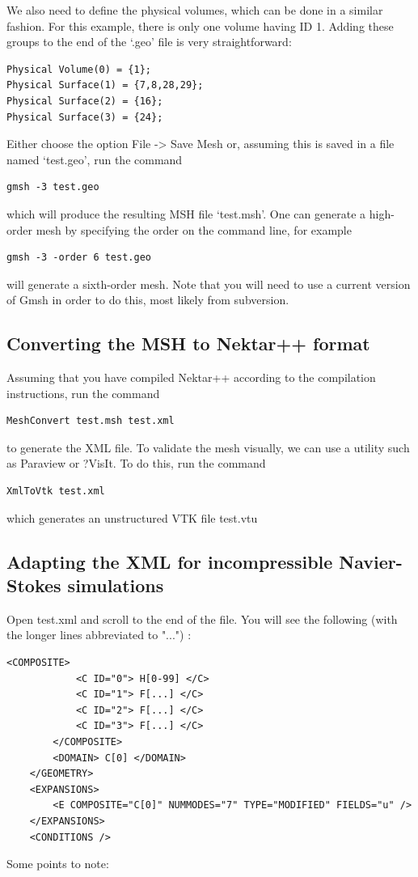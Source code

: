 We also need to define the physical volumes, which can be done in a similar fashion. For this example, there is only one volume having ID 1. Adding these groups to the end of the `.geo' file is very straightforward:

\begin{lstlisting}[style=XmlStyle]
Physical Volume(0) = {1};
Physical Surface(1) = {7,8,28,29};
Physical Surface(2) = {16};
Physical Surface(3) = {24};
\end{lstlisting}
Either choose the option File -> Save Mesh or, assuming this is saved in a file named `test.geo', run the command
\begin{lstlisting}[style=BashInputStyle]
gmsh -3 test.geo
\end{lstlisting}
which will produce the resulting MSH file `test.msh'. One can generate a high-order mesh by specifying the order on the command line, for example
\begin{lstlisting}[style=BashInputStyle]
gmsh -3 -order 6 test.geo
\end{lstlisting}
will generate a sixth-order mesh. Note that you will need to use a current version of Gmsh in order to do this, most likely from subversion.
\subsection{Converting the MSH to Nektar++ format}
Assuming that you have compiled Nektar++ according to the compilation instructions, run the command
\begin{lstlisting}[style=BashInputStyle]
MeshConvert test.msh test.xml
\end{lstlisting}
to generate the XML file. To validate the mesh visually, we can use a utility such as Paraview or ?VisIt. To do this, run the command
\begin{lstlisting}[style=BashInputStyle]
XmlToVtk test.xml
\end{lstlisting}
which generates an unstructured VTK file test.vtu
\subsection{Adapting the XML for incompressible Navier-Stokes simulations}
Open test.xml and scroll to the end of the file. You will see the following (with the longer lines abbreviated to "...") :
\begin{lstlisting}[style=XmlStyle]
     <COMPOSITE>
            <C ID="0"> H[0-99] </C>
            <C ID="1"> F[...] </C>
            <C ID="2"> F[...] </C>
            <C ID="3"> F[...] </C>
        </COMPOSITE>
        <DOMAIN> C[0] </DOMAIN>
    </GEOMETRY>
    <EXPANSIONS>
        <E COMPOSITE="C[0]" NUMMODES="7" TYPE="MODIFIED" FIELDS="u" />
    </EXPANSIONS>
    <CONDITIONS />
\end{lstlisting}
    Some points to note:


